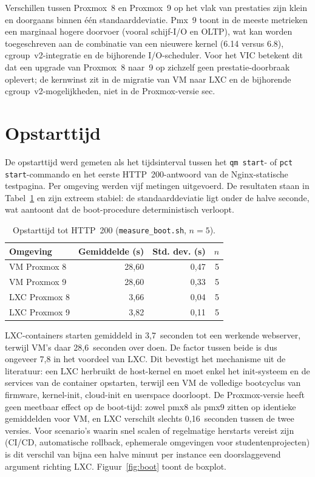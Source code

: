 Verschillen tussen Proxmox~8 en Proxmox~9 op het vlak van prestaties zijn klein en doorgaans binnen één standaarddeviatie. Pmx~9 toont in de meeste metrieken een marginaal hogere doorvoer (vooral schijf-I/O en OLTP), wat kan worden toegeschreven aan de combinatie van een nieuwere kernel (6.14 versus 6.8), cgroup~v2-integratie en de bijhorende I/O-scheduler. Voor het VIC betekent dit dat een upgrade van Proxmox~8 naar~9 op zichzelf geen prestatie-doorbraak oplevert; de kernwinst zit in de migratie van VM naar LXC en de bijhorende cgroup~v2-mogelijkheden, niet in de Proxmox-versie sec.

\section{Opstarttijd}
\label{sec:opstarttijd}

De opstarttijd werd gemeten als het tijdsinterval tussen het \texttt{qm start}- of \texttt{pct start}-commando en het eerste HTTP~200-antwoord van de Nginx-statische testpagina. Per omgeving werden vijf metingen uitgevoerd. De resultaten staan in Tabel~\ref{tab:boot-summary} en zijn extreem stabiel: de standaarddeviatie ligt onder de halve seconde, wat aantoont dat de boot-procedure deterministisch verloopt.

\begin{table}[h]
    \centering
    \caption[Opstarttijd per omgeving]{Opstarttijd tot HTTP~200 (\texttt{measure\_boot.sh}, $n=5$).}
    \label{tab:boot-summary}
    \begin{tabular}{lrrr}
        \toprule
        \textbf{Omgeving} & \textbf{Gemiddelde (s)} & \textbf{Std. dev. (s)} & \textbf{$n$} \\
        \midrule
        VM Proxmox 8     & 28,60 & 0,47 & 5 \\
        VM Proxmox 9     & 28,60 & 0,33 & 5 \\
        LXC Proxmox 8    &  3,66 & 0,04 & 5 \\
        LXC Proxmox 9    &  3,82 & 0,11 & 5 \\
        \bottomrule
    \end{tabular}
\end{table}

LXC-containers starten gemiddeld in 3,7~seconden tot een werkende webserver, terwijl VM's daar 28,6~seconden over doen. De factor tussen beide is dus ongeveer 7,8 in het voordeel van LXC. Dit bevestigt het mechanisme uit de literatuur: een LXC herbruikt de host-kernel en moet enkel het init-systeem en de services van de container opstarten, terwijl een VM de volledige bootcyclus van firmware, kernel-init, cloud-init en userspace doorloopt. De Proxmox-versie heeft geen meetbaar effect op de boot-tijd: zowel pmx8 als pmx9 zitten op identieke gemiddelden voor VM, en LXC verschilt slechts 0,16~seconden tussen de twee versies. Voor scenario's waarin snel scalen of regelmatige herstarts vereist zijn (CI/CD, automatische rollback, ephemerale omgevingen voor studentenprojecten) is dit verschil van bijna een halve minuut per instance een doorslaggevend argument richting LXC. Figuur~\ref{fig:boot} toont de boxplot.

